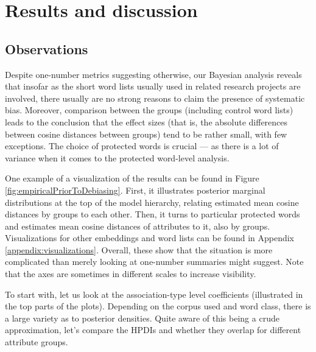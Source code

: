 \documentclass{clv3}
\begin{document}
\normalsize

\hypertarget{results-and-discussion}{%
\section{Results and discussion}\label{results-and-discussion}}

\label{sec:results}

\vspace{1mm}

\normalsize

\hypertarget{observations}{%
\subsection{Observations}\label{observations}}

\label{subsec:observations}

Despite one-number metrics suggesting otherwise, our Bayesian
analysis reveals that insofar as the short word lists usually used in
related research projects are involved, there usually are no strong
reasons to claim the presence of systematic bias. Moreover, comparison
between the groups (including control word lists) leads to the
conclusion that the effect sizes (that is, the absolute differences
between cosine distances between groups) tend to be rather small, with
few exceptions. The choice of protected words is crucial ---
as there is a lot of variance when it comes to the protected word-level
analysis.

One example of a visualization of the results can be found in Figure \ref{fig:empiricalPriorToDebiasing}. First, it illustrates posterior marginal distributions at the top of the model hierarchy, relating  estimated mean cosine distances by groups to each other. Then, it turns to particular protected words and estimates mean cosine distances of attributes to it, also by groups.  Visualizations for other embeddings and word lists can be found in Appendix \ref{appendix:visualizations}. Overall, these show that the situation is more
complicated than merely looking at one-number summaries might suggest.
Note that the axes are sometimes in different scales to increase
visibility.

To start with, let us look at the association-type level coefficients
(illustrated in the top parts of the plots). Depending on the corpus
used and word class, there is a large variety as to posterior
densities. Quite aware of this being a crude approximation, let's
compare the HPDIs and whether they overlap for different attribute
groups.
\end{document}
